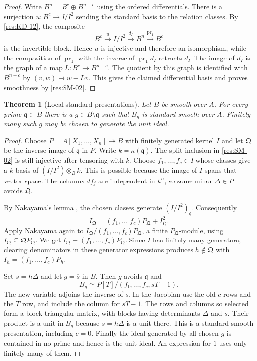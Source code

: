 \documentclass[11pt,oneside,openany]{book}
\newtheorem{theorem}{Theorem}[chapter]
\theoremstyle{definition}
\theoremstyle{remark}
\begin{document}
\begin{proof}
Write $B^n=B^c\oplus B^{n-c}$ using the ordered differentials.
There is a surjection $u\colon B^c\to I/I^2$ sending the standard
basis to the relation classes. By \ref{res:KD-12}, the composite
\[
  B^c\xrightarrow{u} I/I^2\xrightarrow{d_I} B^n
       \xrightarrow{\operatorname{pr}_1} B^c
\]
is the invertible block. Hence $u$ is injective and therefore an
isomorphism, while the composition of $\operatorname{pr}_1$
with the inverse of $\operatorname{pr}_1 d_I$ retracts $d_I$.
The image of $d_I$ is the graph of a map $L\colon B^c\to B^{n-c}$.
The quotient by this graph is identified with $B^{n-c}$ by
$(v,w)\mapsto w-Lv$. This gives the claimed differential basis
and proves smoothness by \ref{res:SM-02}.
\end{proof}

\begin{theorem}[Local standard presentations]
\label{res:SM-05}
Let $B$ be smooth over $A$. For every prime $\mathfrak q\subset B$
there is a $g\in B\setminus\mathfrak q$ such that $B_g$ is standard
smooth over $A$. Finitely many such $g$ may be chosen to generate
the unit ideal.
\end{theorem}

\begin{proof}
Choose $P=A[X_1,\ldots,X_n]\twoheadrightarrow B$ with finitely
generated kernel $I$ and let $\mathfrak Q$ be the inverse image
of $\mathfrak q$ in $P$. Write $k=\kappa(\mathfrak q)$.
The split inclusion in \ref{res:SM-02} is still injective after
tensoring with $k$. Choose $f_1,\ldots,f_c\in I$ whose classes
give a $k$-basis of $(I/I^2)\otimes_B k$. This is possible because
the image of $I$ spans that vector space. The columns $df_j$ are
independent in $k^n$, so some minor $\Delta\in P$ avoids
$\mathfrak Q$.

By Nakayama's lemma \cite[Theorem ALG-05-C04-R01]{p103}, the
chosen classes generate $(I/I^2)_{\mathfrak q}$. Consequently
\[
  I_{\mathfrak Q}
    =(f_1,\ldots,f_c)P_{\mathfrak Q}+I_{\mathfrak Q}^2.
\]
Apply Nakayama again to
$I_{\mathfrak Q}/(f_1,\ldots,f_c)P_{\mathfrak Q}$, a finite
$P_{\mathfrak Q}$-module, using
$I_{\mathfrak Q}\subseteq\mathfrak QP_{\mathfrak Q}$. We get
$I_{\mathfrak Q}=(f_1,\ldots,f_c)P_{\mathfrak Q}$. Since $I$
has finitely many generators, clearing denominators in these
generator expressions produces $h\notin\mathfrak Q$ with
$I_h=(f_1,\ldots,f_c)P_h$.

Set $s=h\Delta$ and let $g=\overline s$ in $B$. Then $g$ avoids
$\mathfrak q$ and
\[
  B_g\simeq P[T]/(f_1,\ldots,f_c,sT-1).
\]
The new variable adjoins the inverse of $s$. In the Jacobian use
the old $c$ rows and the $T$ row, and include the column for
$sT-1$. The rows and columns so selected form a block triangular
matrix, with blocks having determinants $\Delta$ and $s$.
Their product is a unit in $B_g$ because $s=h\Delta$ is a unit
there. This is a standard smooth presentation, including $c=0$.
Finally the ideal generated by all chosen $g$ is contained in no
prime and hence is the unit ideal. An expression for $1$ uses
only finitely many of them.
\end{proof}
\end{document}
